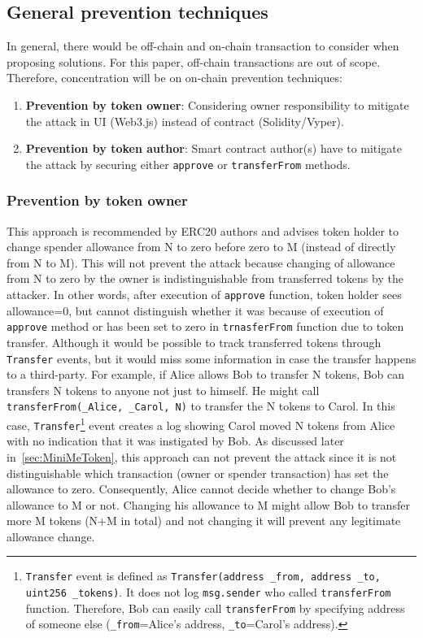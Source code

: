 \subsection{General prevention techniques}

\noindent In general, there would be off-chain and on-chain transaction to consider when proposing solutions. For this paper, off-chain transactions are out of scope. Therefore, concentration will be on on-chain prevention techniques:
\begin{enumerate}
	\item \textbf{Prevention by token owner}: Considering owner responsibility to mitigate the attack in UI (\eg Web3.js) instead of contract (\ie Solidity/Vyper).
	\item \textbf{Prevention by token author}: Smart contract author(s) have to mitigate the attack by securing either \texttt{approve} or \texttt{transferFrom} methods.
\end{enumerate}

\subsubsection*{Prevention by token owner} This approach is recommended by ERC20 authors \cite{Ref08} and advises token holder to change spender allowance from N to zero before zero to M (instead of directly from N to M). This will not prevent the attack because changing of allowance from N to zero by the owner is indistinguishable from transferred tokens by the attacker. In other words, after execution of \texttt{approve} function, token holder sees allowance=0, but cannot distinguish whether it was because of execution of \texttt{approve} method or has been set to zero in \texttt{trnasferFrom} function due to token transfer. Although it would be possible to track transferred tokens through \texttt{Transfer} events, but it would miss some information in case the transfer happens to a third-party. For example, if Alice allows Bob to transfer N tokens, Bob can transfers N tokens to anyone not just to himself. He might call \texttt{transferFrom(\_Alice, \_Carol, N)} to transfer the N tokens to Carol. In this case, \texttt{Transfer}\footnote{\texttt{Transfer} event is defined as \texttt{Transfer(address \_from, address \_to, uint256 \_tokens)}. It does not log \texttt{msg.sender} who called \texttt{transferFrom} function. Therefore, Bob can easily call \texttt{transferFrom} by specifying address of someone else (\texttt{\_from}=Alice's address, \texttt{\_to}=Carol's address).} event creates a log showing Carol moved N tokens from Alice with no indication that it was instigated by Bob. As discussed later in~\ref{sec:MiniMeToken}, this approach can not prevent the attack since it is not distinguishable which transaction (\ie owner or spender transaction) has set the allowance to zero. Consequently, Alice cannot decide whether to change Bob's allowance to M or not. Changing his allowance to M might allow Bob to transfer more M tokens (N+M in total) and not changing it will prevent any legitimate allowance change.

